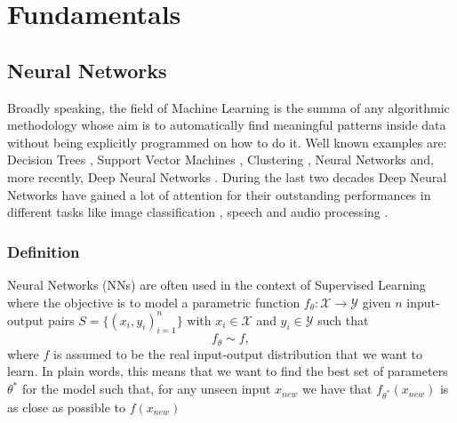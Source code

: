 \documentclass[LaM,binding=0.6cm]{./packages/sapthesis/sapthesis}
\begin{document}
\part{Fundamentals}


\chapter{Neural Networks}
        \label{chap:2}
        Broadly speaking, the field of Machine Learning is the summa of any algorithmic methodology whose aim is to automatically find meaningful patterns inside data without
        being explicitly programmed on how to do it. Well known examples are: Decision Trees \cite{decision_tree}, Support Vector Machines \cite{svm}, Clustering \cite{clusters},
        Neural Networks \cite{perceptron} and, more recently, 
        Deep Neural Networks \cite{deepnn}. During the last two decades Deep Neural Networks have gained a lot of attention for their outstanding performances in different tasks like
        image classification \cite{imagenet}, speech and audio processing \cite{dlaudioprocessing}.

        \section{Definition}
            
            Neural Networks (NNs) are often used in the context of Supervised Learning where the objective is to model a parametric function 
            $ f_{\theta} \colon \mathcal{X} \to \mathcal{Y}$ given $n$ input-output pairs $S = \{(x_i, y_i)_{i=1}^n\} $ with $x_i \in \mathcal{X}$ and $ y_i \in \mathcal{Y}$
            such that
            \begin{equation}
                f_{\theta} \sim f,
            \end{equation}
            where $f$ is assumed to be the real input-output distribution that we want to learn. In plain words, this means that we want to find the best set of parameters $\theta^{*}$ for the model
            such that, for any unseen input $x_{new}$ we have that $f_{\theta^*}\left(x_{new}\right)$ is as close as possible to $f\left(x_{new}\right)$
\end{document}
